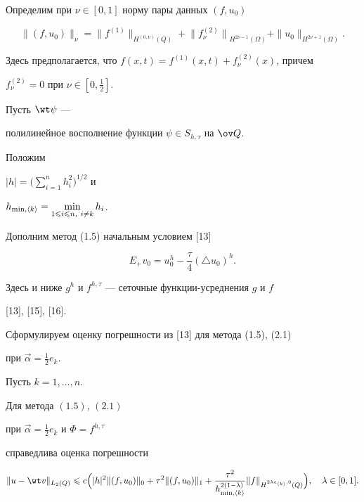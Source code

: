 Определим при $\nu\in [0,1]$ норму пары данных $(f,u_0)$


$$


\|(f,u_0)\|_\nu=\|f^{(1)}\|_{H^{(0,\nu)}(Q)}


+{\| f^{(2)}_\nu\|}_{H^{2\nu-1}(\Omega)}


+\|u_0\|_{H^{2\nu+1}(\Omega)}.


$$


Здесь предполагается, что $f(x,t)=f^{(1)}(x,t)+f^{(2)}_\nu(x)$, причем


$f^{(2)}_\nu =0$ при $\nu\in [0,\frac{1}{2}]$.





Пусть $\wt \psi$ ---


полилинейное восполнение функции $\psi\in S_{h,\tau}$ на $\ov Q$.


Положим 


$| h|=\Big(\sum\limits_{i=1}^n h_i^2\Big)^{1/2}$ и 


$h_{\min,\langle k\rangle}=\min\limits_{1\leqslant i\leqslant n,\ i\ne k}h_i$.





Дополним метод (1.5) начальным условием [13] 


\begin{equation}


E_+v_0=u_0^h-\frac{\tau}{4}(\triangle u_0)^h.


\end{equation}


Здесь и ниже $g^h$ и $f^{h,\tau}$ --- сеточные функции-усреднения $g$ и $f$


[13], [15], [16].





Сформулируем оценку погрешности из [13] для метода (1.5), (2.1)


при $\Vec\alpha=\frac{1}{2}e_k$.





\begin{thm}  Пусть $k=1,\dotsc,n$.


Для метода $(1.5)$, $(2.1)$


при $\Vec\alpha=\frac{1}{2}e_k$ и $\Phi=f^{h,\tau}$


справедлива оценка погрешности


\begin{equation}


\|u-\wt v\|_{L_2(Q)}\lee c\Big(|h|^2\|(f,u_0)\|_0+


\tau^2\|(f,u_0)\|_1+\frac{\tau^2}{h^{2(1-\lambda)}_{\min,\langle k\rangle}}


\|f\|_{H^{2\lambda e_{\langle k\rangle},0}(Q)}\Big),\quad


\lambda\in [0,1].


\end{equation}


\end{thm}





